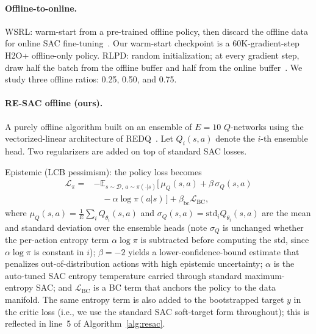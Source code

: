 \documentclass[journal,10pt]{IEEEtran}
\begin{document}
\paragraph{Offline-to-online.}
WSRL: warm-start from a pre-trained offline policy, then discard the offline data for online SAC fine-tuning~\cite{zhou2024efficient}. Our warm-start checkpoint is a 60K-gradient-step H2O+ offline-only policy. RLPD: random initialization; at every gradient step, draw half the batch from the offline buffer and half from the online buffer~\cite{ball2023efficient}. We study three offline ratios: 0.25, 0.50, and 0.75.

\paragraph{RE-SAC offline (ours).}
A purely offline algorithm built on an ensemble of $E=10$ $Q$-networks using the vectorized-linear architecture of REDQ~\cite{chen2021randomized}. Let $Q_i(s,a)$ denote the $i$-th ensemble head. Two regularizers are added on top of standard SAC losses.

Epistemic (LCB pessimism): the policy loss becomes
\begin{equation}
\begin{aligned}
    \mathcal{L}_\pi = & -\mathbb{E}_{s \sim \mathcal{D},\, a \sim \pi(\cdot|s)} \big[\, \mu_Q(s,a) + \beta\, \sigma_Q(s,a) \\
                      & \quad - \alpha \log \pi(a|s) \, \big] + \beta_{\text{bc}} \mathcal{L}_{\text{BC}},
\end{aligned}
\label{eq:lcb}
\end{equation}
where $\mu_Q(s,a) = \tfrac{1}{E}\sum_i Q_{\theta_i}(s,a)$ and $\sigma_Q(s,a) = \mathrm{std}_i Q_{\theta_i}(s,a)$ are the mean and standard deviation over the ensemble heads (note $\sigma_Q$ is unchanged whether the per-action entropy term $\alpha \log\pi$ is subtracted before computing the std, since $\alpha\log\pi$ is constant in $i$); $\beta = -2$ yields a lower-confidence-bound estimate that penalizes out-of-distribution actions with high epistemic uncertainty; $\alpha$ is the auto-tuned SAC entropy temperature carried through standard maximum-entropy SAC; and $\mathcal{L}_{\text{BC}}$ is a BC term that anchors the policy to the data manifold. The same entropy term is also added to the bootstrapped target $y$ in the critic loss (i.e., we use the standard SAC soft-target form throughout); this is reflected in line~5 of Algorithm~\ref{alg:resac}.
\end{document}
